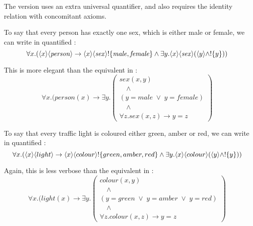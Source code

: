 \NI The \fol{} version uses an extra universal quantifier, and also
requires the identity relation with concomitant axioms.

To say that every person has exactly one sex, which is either male or
female, we can write in quantified \cathoristic{}:
\[
   \forall x . 
      ( \langle x \rangle \langle \mathit{person} \rangle \rightarrow \langle x \rangle \langle \mathit{sex} \rangle !\{\mathit{male}, \mathit{female}\} 
      \land 
      \exists y . \langle x \rangle \langle \mathit{sex} \rangle (\langle y \rangle \land
   ! \{y\}) )
\]

\NI This is more elegant than the equivalent in \fol{}:
\[
   \forall x. ( \mathit{person}(x) \rightarrow \exists y .
   \left(
      \begin{array}{l}
        \mathit{sex}(x,y) \\
        \quad\land\\
        (y = \mathit{male} \; \lor \; y = \mathit{female})\\ 
        \quad\land\\
        \forall z . \mathit{sex}(x,z) \rightarrow    y = z 
      \end{array}
   \right)
\]

\NI To say that every traffic light is coloured either green, amber or
red, we can write in quantified \cathoristic{}:
\[
   \forall x. (\langle x \rangle \langle light \rangle \rightarrow \langle x \rangle \langle colour \rangle !\{green, amber, red\} \land \exists y . \langle x \rangle \langle colour \rangle (\langle y \rangle \land !\{y\}))
\]

\NI Again, this is less verbose than the equivalent in
\fol{}:
\[
   \forall x. ( light(x) \rightarrow \exists y .
   \left(
      \begin{array}{l}
        colour(x,y) \\
        \quad\land\\
        (y = green \; \lor \; y = amber \; \lor \; y = red) \\
        \quad\land \\
        \forall z . colour(x,z) \rightarrow y = z
      \end{array}
   \right) 
\]

